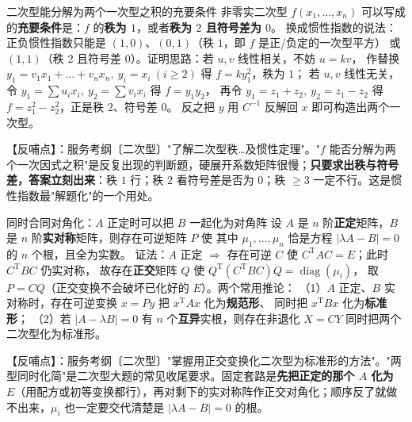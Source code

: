 \begin{fdeep}{二次型能分解为两个一次型之积的充要条件}
非零实二次型 $f(x_1,\dots,x_n)$ 可以写成
的\textbf{充要条件}是：$f$ 的\textbf{秩为 $1$}，或者\textbf{秩为 $2$ 且符号差为 $0$}。
换成惯性指数的说法：正负惯性指数只能是 $(1,0)$、$(0,1)$（秩 $1$，即 $f$ 是正/负定的一次型平方）
或 $(1,1)$（秩 $2$ 且符号差 $0$）。证明思路：若 $u,v$ 线性相关，不妨 $u=kv$，
作替换 $y_1=v_1x_1+\dots+v_nx_n,\ y_i=x_i\ (i\ge2)$ 得 $f=ky_1^{2}$，秩为 $1$；
若 $u,v$ 线性无关，令 $y_1=\sum u_ix_i,\ y_2=\sum v_ix_i$ 得 $f=y_1y_2$，
再令 $y_1=z_1+z_2,\ y_2=z_1-z_2$ 得 $f=z_1^{2}-z_2^{2}$，正是秩 $2$、符号差 $0$。
反之把 $y$ 用 $C^{-1}$ 反解回 $x$ 即可构造出两个一次型。

【反哺点】：服务考纲〔二次型〕"了解二次型秩…及惯性定理"。"$f$ 能否分解为两个一次因式之积"是反复出现的判断题，硬展开系数矩阵很慢；\textbf{只要求出秩与符号差，答案立刻出来}：秩 $1$ 行；秩 $2$ 看符号差是否为 $0$；秩 $\ge3$ 一定不行。这是惯性指数最"解题化"的一个用处。
\end{fdeep}

\begin{fdeep}{同时合同对角化：$A$ 正定时可以把 $B$ 一起化为对角阵}
设 $A$ 是 $n$ 阶\textbf{正定}矩阵，$B$ 是 $n$ 阶\textbf{实对称}矩阵，则存在可逆矩阵 $P$ 使
其中 $\mu_1,\dots,\mu_n$ 恰是方程 $|\lambda A-B|=0$ 的 $n$ 个根，且全为实数。
证法：$A$ 正定 $\Longrightarrow$ 存在可逆 $C$ 使 $C^{\mathrm T}AC=E$；此时 $C^{\mathrm T}BC$ 仍实对称，
故存在\textbf{正交}矩阵 $Q$ 使 $Q^{\mathrm T}(C^{\mathrm T}BC)Q=\operatorname{diag}(\mu_i)$，
取 $P=CQ$（正交变换不会破坏已化好的 $E$）。两个常用推论：
（1）$A$ 正定、$B$ 实对称时，存在可逆变换 $x=Py$ 把 $x^{\mathrm T}Ax$ 化为\textbf{规范形}、
同时把 $x^{\mathrm T}Bx$ 化为\textbf{标准形}；
（2）若 $|A-\lambda B|=0$ 有 $n$ 个\textbf{互异}实根，则存在非退化 $X=CY$ 同时把两个二次型化为标准形。

【反哺点】：服务考纲〔二次型〕"掌握用正交变换化二次型为标准形的方法"。"两型同时化简"是二次型大题的常见收尾要求。固定套路是\textbf{先把正定的那个 $A$ 化为 $E$}（用配方或初等变换都行），再对剩下的实对称阵作正交对角化；顺序反了就做不出来，$\mu_i$ 也一定要交代清楚是 $|\lambda A-B|=0$ 的根。
\end{fdeep}


